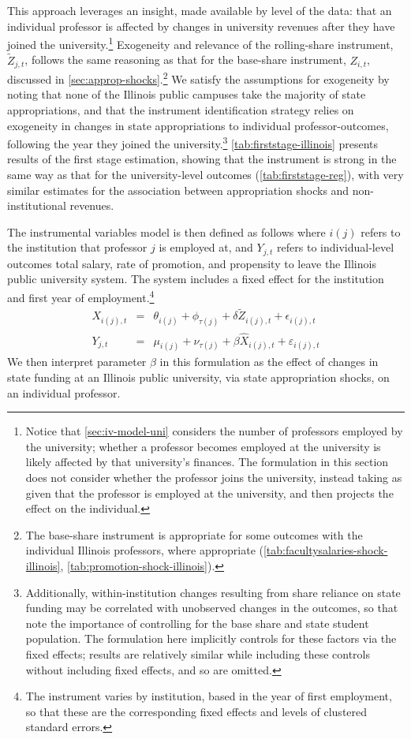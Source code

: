 \documentclass[notitlepage,12pt]{article}
\renewcommand{\tilde}[1]{\widetilde{#1}}                                   %
\begin{document}
This approach leverages an insight, made available by level of the data: that an individual professor is affected by changes in university revenues after they have joined the university.\footnote{
    Notice that \autoref{sec:iv-model-uni} considers the number of professors employed by the university; whether a professor becomes employed at the university is likely affected by that university's finances.
    The formulation in this section does not consider whether the professor joins the university, instead taking as given that the professor is employed at the university, and then projects the effect on the individual.
}
Exogeneity and relevance of the rolling-share instrument, $\tilde Z_{j,t}$, follows the same reasoning as that for the base-share instrument, $Z_{i,t}$, discussed in \autoref{sec:approp-shocks}.\footnote{
    The base-share instrument is appropriate for some outcomes with the individual Illinois professors, where appropriate (\autoref{tab:facultysalaries-shock-illinois}, \ref{tab:promotion-shock-illinois}).
}
We satisfy the assumptions for exogeneity by noting that none of the Illinois public campuses take the majority of state appropriations, and that the instrument identification strategy relies on exogeneity in changes in state appropriations to individual professor-outcomes, following the year they joined the university.\footnote{
    Additionally, within-institution changes resulting from share reliance on state funding may be correlated with unobserved changes in the outcomes, so that \cite{NBERw27885} note the importance of controlling for the base share and state student population.
    The formulation here implicitly controls for these factors via the fixed effects; results are relatively similar while including these controls without including fixed effects, and so are omitted.
}
\autoref{tab:firststage-illinois} presents results of the first stage estimation, showing that the instrument is strong in the same way as that for the university-level outcomes (\autoref{tab:firststage-reg}), with very similar estimates for the association between appropriation shocks and non-institutional revenues.

The instrumental variables model is then defined as follows where $i(j)$ refers to the institution that professor $j$ is employed at, and $Y_{j,t}$ refers to individual-level outcomes total salary, rate of promotion, and propensity to leave the Illinois public university system.
The system includes a fixed effect for the institution and first year of employment.\footnote{
    The instrument varies by institution, based in the year of first employment, so that these are the corresponding fixed effects and levels of clustered standard errors.
}
\begin{eqnarray}
    \label{eqn:secondstage1_indiv}
    X_{i(j),t} &=& \theta_{i(j)} + \phi_{\tau(j)} + \delta \tilde Z_{i(j),t} + \epsilon_{i(j),t} \\
    \label{eqn:secondstage2_indiv}
    Y_{j,t} &=& \mu_{i(j)} + \nu_{\tau(j)} + \beta \widehat X_{i(j),t} + \varepsilon_{i(j),t}
\end{eqnarray}
We then interpret parameter $\beta$ in this formulation as the effect of changes in state funding at an Illinois public university, via state appropriation shocks, on an individual professor.
\end{document}
